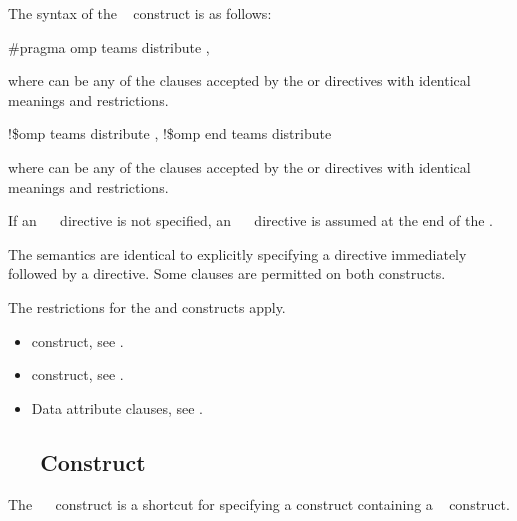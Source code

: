 \syntax
The syntax of the ~ construct is as follows:

\ccppspecificstart
\begin{boxedcode}
\#pragma omp teams distribute \plc{[clause[ [},\plc{] clause] ... ]}
\end{boxedcode}

where  can be any of the clauses accepted by the  or  
directives with identical meanings and restrictions.
\ccppspecificend

\fortranspecificstart
\begin{boxedcode}
!\$omp teams distribute \plc{[clause[ [},\plc{] clause] ... ]}
\plc{[}!\$omp end teams distribute\plc{]}
\end{boxedcode}

where  can be any of the clauses accepted by the  or  
directives with identical meanings and restrictions.

If an ~~ directive is not specified, an 
~~ directive is assumed at the end of the .
\fortranspecificend

\descr
The semantics are identical to explicitly specifying a  directive immediately 
followed by a  directive. Some clauses are permitted on both constructs.

\restrictions
The restrictions for the  and  constructs apply.

\crossreferences
\begin{itemize}
\item {} construct, see 
.

\item {} construct, see 
.

\item Data attribute clauses, see 
.
\end{itemize}












\subsection{~~ Construct}
\label{subsec:teams distribute simd Construct}
\summary
The ~~ construct is a shortcut for specifying a  construct 
containing a ~ construct.

